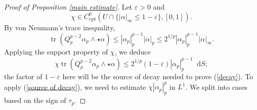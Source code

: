 \documentclass[reqno,11pt]{amsart}
\newcommand*\dif{\mathop{}\!\mathrm{d}}
\DeclareMathOperator{\tr}{tr}
\newcommand{\cpt}{\mathrm{cpt}}
\theoremstyle{definition}
\numberwithin{equation}{section}
\begin{document}
\begin{proof}[Proof of Proposition \ref{main estimate}]
Let $\varepsilon > 0$ and
$$\chi \in C^0_\cpt(U \cap \{|\alpha|_\infty \leq 1 - \varepsilon\}, [0, 1]).$$
By von Neumann's trace inequality, 
$$\tr(Q_p^{p - 2} \alpha_p \wedge \star \alpha) \leq |\alpha_p|_p^{p - 1} |\alpha|_p \leq 2^{1/p} |\alpha_p|_p^{p - 1} |\alpha|_\infty.$$
Applying the support property of $\chi$, we deduce
\begin{equation}\label{source of decay}
\chi \tr(Q_p^{p - 2} \alpha_p \wedge \star \alpha) \leq 2^{1/p} (1 - \varepsilon) |\alpha_p|_p^{p - 1} \dif S;
\end{equation}
the factor of $1 - \varepsilon$ here will be the source of decay needed to prove (\ref{decay}).
To apply (\ref{source of decay}), we need to estimate $\chi |\alpha_p|_p^p$ in $L^1$.
We split into cases based on the sign of $\tau_p$.


\end{proof}
\end{document}
